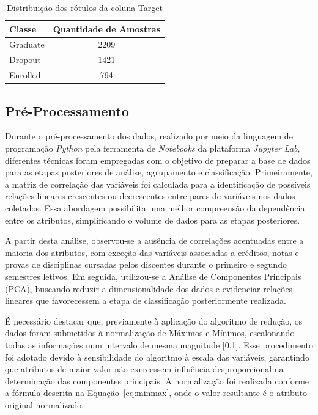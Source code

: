 \begin{table}[htbp]
\caption{Distribuição dos rótulos da coluna Target}
\label{tab:target_distribution}
\centering
\begin{tabular}{lc}
\hline
\textbf{Classe} & \textbf{Quantidade de Amostras} \\
\hline
Graduate & 2209 \\
Dropout  & 1421 \\
Enrolled & 794  \\
\hline
\end{tabular}
\end{table}

\subsection{Pré-Processamento}
Durante o pré-processamento dos dados, realizado por meio da linguagem de programação \textit{Python} pela ferramenta de \textit{Notebooks} da plataforma \textit{Jupyter Lab}, diferentes técnicas foram empregadas com o objetivo de preparar a base de dados para as etapas posteriores de análise, agrupamento e classificação. Primeiramente, a matriz de correlação das variáveis foi calculada para a identificação de possíveis relações lineares crescentes ou decrescentes entre pares de variáveis nos dados coletados. Essa abordagem possibilita uma melhor compreensão da dependência entre os atributos, simplificando o volume de dados para as etapas posteriores.

A partir desta análise, observou-se a ausência de correlações acentuadas entre a maioria dos atributos, com exceção das variáveis associadas a créditos, notas e provas de disciplinas cursadas pelos discentes durante o primeiro e segundo semestres letivos. Em seguida, utilizou-se a Análise de Componentes Principais (PCA), buscando reduzir a dimensionalidade dos dados e evidenciar relações lineares que favorecessem a etapa de classificação posteriormente realizada. 

É necessário destacar que, previamente à aplicação do algoritmo de redução, os dados foram submetidos à normalização de Máximos e Mínimos, escalonando todas as informações num intervalo de mesma magnitude [0,1]. Esse procedimento foi adotado devido à sensibilidade do algoritmo à escala das variáveis, garantindo que atributos de maior valor não exercessem influência desproporcional na determinação das componentes principais. A normalização foi realizada conforme a fórmula descrita na Equação~\ref{eq:minmax}, onde o valor resultante é o atributo original normalizado.

